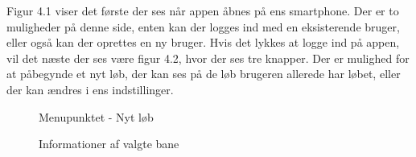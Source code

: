 Figur 4.1 viser det første der ses når appen åbnes på ens smartphone. Der er to muligheder på denne side, enten kan der logges ind med en eksisterende bruger, eller også kan der oprettes en ny bruger. 
Hvis det lykkes at logge ind på appen, vil det næste der ses være figur 4.2, hvor der ses tre knapper. Der er mulighed for at påbegynde et nyt løb, der kan ses på de løb brugeren allerede har løbet, eller der kan ændres i ens indstillinger.

\begin{figure}
\centering
\begin{minipage}{.5\textwidth}
  \centering
  \caption{Menupunktet - Nyt løb}
  \label{fig:test1}
\end{minipage}%
\begin{minipage}{.5\textwidth}
  \centering
  \caption{Informationer af valgte bane}
  \label{fig:test2}
\end{minipage}
\end{figure}
